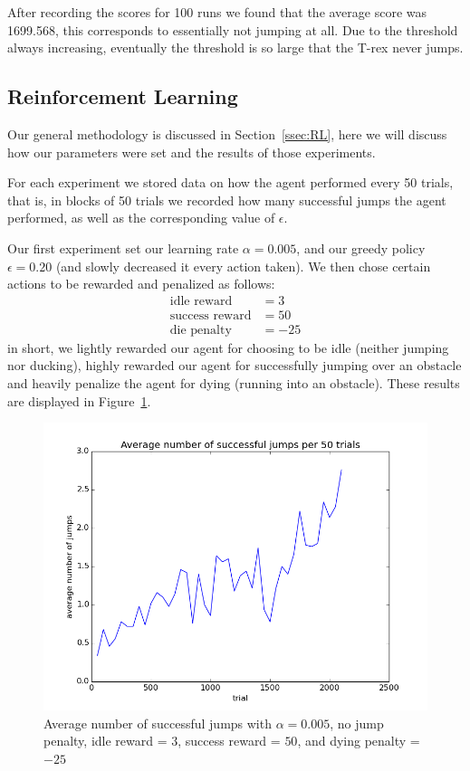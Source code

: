 \documentclass{scrartcl}
\begin{document}
    After recording the scores for 100 runs we found that the average score was
    1699.568, this corresponds to essentially not jumping at all. Due to the
    threshold always increasing, eventually the threshold is so large that the
    T-rex never jumps.

    \subsection{Reinforcement Learning}
    Our general methodology is discussed in Section~\ref{ssec:RL}, here we will
    discuss how our parameters were set and the results of those experiments.

    For each experiment we stored data on how the agent performed every 50
    trials, that is, in blocks of 50 trials we recorded how many successful
    jumps the agent performed, as well as the corresponding value of
    $\epsilon$.

    Our first experiment set our learning rate $\alpha = 0.005$, and our
    greedy policy $\epsilon = 0.20$ (and slowly decreased it every action
    taken). We then chose certain actions to be rewarded and penalized as
    follows:
    \begin{align*}
        \text{idle reward} &= 3\\
        \text{success reward} &= 50\\
        \text{die penalty} & = -25
    \end{align*}
    in short, we lightly rewarded our agent for choosing to be idle (neither
    jumping nor ducking), highly rewarded our agent for successfully jumping
    over an obstacle and heavily penalize the agent for dying (running into an
    obstacle). These results are displayed in Figure~\ref{fig:exp1}.

    \begin{figure}[H]
        \centering
        \includegraphics[width=\textwidth]{../avgJumps1}
        \caption{Average number of successful jumps with $\alpha = 0.005$, no
        jump penalty, idle reward = $3$, success reward = $50$, and dying
        penalty = $-25$}
        \label{fig:exp1}
    \end{figure}
\end{document}
